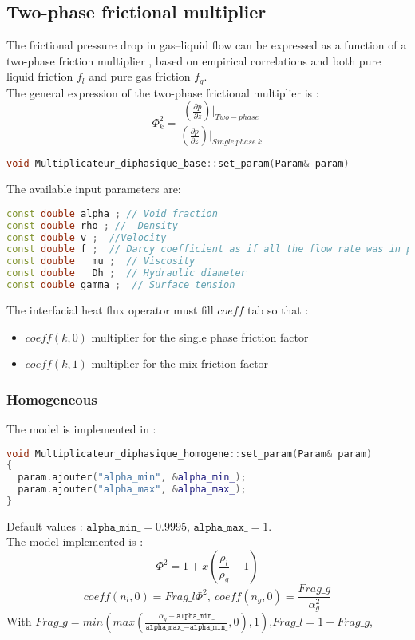 \subsection{Two-phase frictional multiplier}\label{sec:phyical_modeling_frictionl_multiplier}
The frictional pressure drop in gas–liquid flow can be expressed as a function of a two-phase friction multiplier \cite{FARAJI2022111863}, based on empirical correlations and both pure liquid friction $f_l$ and pure gas friction $f_g$. \\
The general expression of the two-phase frictional multiplier is :
\begin{equation}
    \Phi_{k}^2=\frac{(\frac{\partial p}{\partial z})|_{Two-phase}}{(\frac{\partial p}{\partial z})|_{Single\ phase\ k}}
\end{equation}
\begin{lstlisting}[language=c++]
void Multiplicateur_diphasique_base::set_param(Param& param)
\end{lstlisting}
The available input parameters are: 
\begin{lstlisting}[language=c++]
 const double alpha ; // Void fraction
const double rho ; //  Density
const double v ;  //Velocity
const double f ;  // Darcy coefficient as if all the flow rate was in phase k
const double   mu ;  // Viscosity
const double   Dh ;  // Hydraulic diameter 
const double gamma ;  // Surface tension
\end{lstlisting}
The interfacial heat flux operator must fill $coeff$ tab so that :
\begin{itemize}
    \item[\small \textcolor{blue}{\ding{109}}]$coeff(k, 0)$ multiplier for the single phase friction factor
    \item[\small \textcolor{blue}{\ding{109}}]$coeff(k, 1)$ multiplier for the mix friction factor
\end{itemize}


\subsubsection{Homogeneous}
The model is implemented in :
\begin{lstlisting}[language=c++]
void Multiplicateur_diphasique_homogene::set_param(Param& param)
{
  param.ajouter("alpha_min", &alpha_min_);
  param.ajouter("alpha_max", &alpha_max_);
}
\end{lstlisting}
Default values : $\texttt{alpha\_min\_}= 0.9995$, $\texttt{alpha\_max\_} = 1$.\\
The model implemented is :
\begin{equation}
   \Phi^2= 1+x(\frac{\rho_l}{\rho_g}-1) 
\end{equation}
\begin{equation}
    coeff(n_l, 0) = Frag\_l\Phi^2,\ coeff(n_g, 0) = \frac{Frag\_g}{\alpha_g^2}
\end{equation}
With $Frag\_g=min(max(\frac{\alpha_g-\texttt{alpha\_min\_}}{\texttt{alpha\_max\_}-\texttt{alpha\_min\_}},0),1)$,$Frag\_l=1-Frag\_g$,

